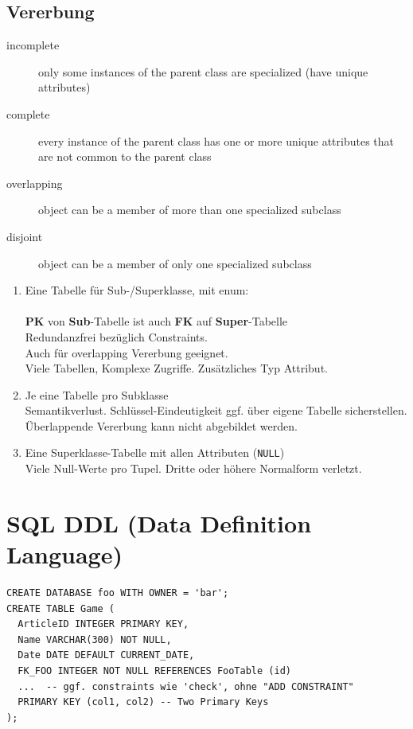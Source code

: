 \begin{multicols*}{3}
\subsection{Vererbung}
\begin{description}
    \item[incomplete] only some instances of the parent class are specialized (have unique attributes)
    \item[complete] every instance of the parent class has one or more unique attributes that are not common to the parent class
    \item[overlapping] object can be a member of more than one specialized subclass
    \item[disjoint] object can be a member of only one specialized subclass
\end{description}
\vspace{3pt}
\begin{enumerate}
\item Eine Tabelle für Sub-/Superklasse, mit enum: \\
    \\
    \textbf{PK} von \textbf{Sub}-Tabelle ist auch \textbf{FK} auf \textbf{Super}-Tabelle
    \\
    Redundanzfrei bezüglich Constraints.
    \\Auch für overlapping Vererbung geeignet.
    \\
    Viele Tabellen, Komplexe Zugriffe. Zusätzliches Typ Attribut.

\item Je eine Tabelle pro Subklasse\\
    Semantikverlust. Schlüssel-Eindeutigkeit ggf. über eigene Tabelle sicherstellen. Überlappende Vererbung kann nicht abgebildet werden.

\item Eine Superklasse-Tabelle mit allen Attributen (\verb!NULL!)\\
    Viele Null-Werte pro Tupel. Dritte oder höhere Normalform verletzt.
\end{enumerate}

\section{SQL DDL (Data Definition Language)}

\begin{verbatim}
CREATE DATABASE foo WITH OWNER = 'bar';
CREATE TABLE Game (
  ArticleID INTEGER PRIMARY KEY,
  Name VARCHAR(300) NOT NULL,
  Date DATE DEFAULT CURRENT_DATE,
  FK_FOO INTEGER NOT NULL REFERENCES FooTable (id)
  ...  -- ggf. constraints wie 'check', ohne "ADD CONSTRAINT"
  PRIMARY KEY (col1, col2) -- Two Primary Keys
);
\end{verbatim}


\end{multicols*}
